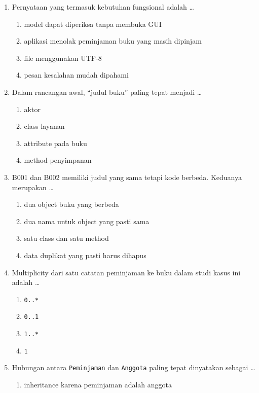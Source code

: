 \begin{enumerate}
  \item Pernyataan yang termasuk kebutuhan fungsional adalah \ldots
  \begin{enumerate}[label=\alph*.,itemsep=0pt]
    \item model dapat diperiksa tanpa membuka GUI
    \item aplikasi menolak peminjaman buku yang masih dipinjam
    \item file menggunakan UTF-8
    \item pesan kesalahan mudah dipahami
  \end{enumerate}
  \item Dalam rancangan awal, ``judul buku'' paling tepat menjadi \ldots
  \begin{enumerate}[label=\alph*.,itemsep=0pt]
    \item aktor
    \item class layanan
    \item attribute pada buku
    \item method penyimpanan
  \end{enumerate}
  \item B001 dan B002 memiliki judul yang sama tetapi kode berbeda. Keduanya merupakan \ldots
  \begin{enumerate}[label=\alph*.,itemsep=0pt]
    \item dua object buku yang berbeda
    \item dua nama untuk object yang pasti sama
    \item satu class dan satu method
    \item data duplikat yang pasti harus dihapus
  \end{enumerate}
  \item Multiplicity dari satu catatan peminjaman ke buku dalam studi kasus ini adalah \ldots
  \begin{enumerate}[label=\alph*.,itemsep=0pt]
    \item \texttt{0..*}
    \item \texttt{0..1}
    \item \texttt{1..*}
    \item \texttt{1}
  \end{enumerate}
  \item Hubungan antara \texttt{Peminjaman} dan \texttt{Anggota} paling tepat dinyatakan sebagai \ldots
  \begin{enumerate}[label=\alph*.,itemsep=0pt]
    \item inheritance karena peminjaman adalah anggota

\end{enumerate}
\end{enumerate}
